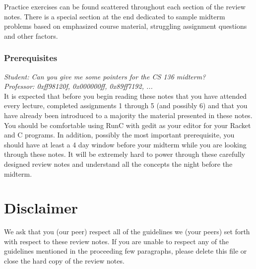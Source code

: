 \documentclass[11pt, twoside, exarticle]{article}
\begin{document}
Practice exercises can be found scattered throughout each section of the review notes. There is a special section at the end dedicated to sample midterm problems based on emphasized course material, struggling assignment questions and other factors.

\subsubsection*{Prerequisites}

\textit{Student: Can you give me some pointers for the CS 136 midterm?}\\
\textit{Professor: 0xff98120f, 0x000000ff, 0x89ff7192, ...}\\

It is expected that before you begin reading these notes that you have attended every lecture, completed assignments 1 through 5 (and possibly 6) and that you have already been introduced to a majority the material presented in these notes.\\

You should be comfortable using RunC with gedit as your editor for your Racket and C programs. In addition, possibly the most important prerequisite, you should have at least a 4 day window before your midterm while you are looking through these notes. It will be extremely hard to power through these carefully designed review notes and understand all the concepts the night before the midterm.

\clearpage
\thispagestyle{empty}
\section*{Disclaimer}

We ask that you (our peer) respect all of the guidelines we (your peers) set forth with respect to these review notes. If you are unable to respect any of the guidelines mentioned in the proceeding few paragraphs, please delete this file or close the hard copy of the review notes.\\
\end{document}
